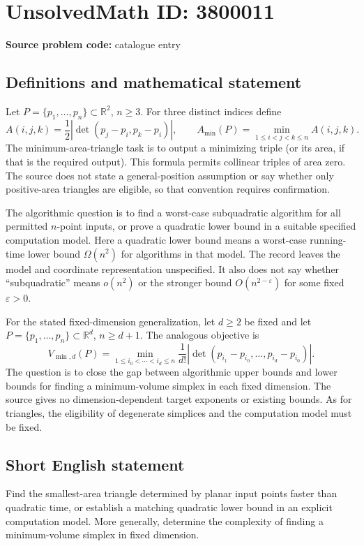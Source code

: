\documentclass[11pt]{article}
\newcommand{\R}{\mathbb{R}}
\begin{document}
\section*{UnsolvedMath ID: 3800011}
\textbf{Source problem code:} catalogue entry
\subsection{Definitions and mathematical statement}
Let $P=\{p_1,\ldots,p_n\}\subset\R^2$, $n\ge3$. For three distinct indices define
\[
 A(i,j,k)=\frac12\left|\det(p_j-p_i,p_k-p_i)\right|,
 \qquad A_{\min}(P)=\min_{1\le i<j<k\le n}A(i,j,k).
\]
The minimum-area-triangle task is to output a minimizing triple (or its area, if that is the required output). This formula permits collinear triples of area zero. The source does not state a general-position assumption or say whether only positive-area triangles are eligible, so that convention requires confirmation.

The algorithmic question is to find a worst-case subquadratic algorithm for all permitted $n$-point inputs, or prove a quadratic lower bound in a suitable specified computation model. Here a quadratic lower bound means a worst-case running-time lower bound $\Omega(n^2)$ for algorithms in that model. The record leaves the model and coordinate representation unspecified. It also does not say whether ``subquadratic'' means $o(n^2)$ or the stronger bound $O(n^{2-\varepsilon})$ for some fixed $\varepsilon>0$.

For the stated fixed-dimension generalization, let $d\ge2$ be fixed and let $P=\{p_1,\ldots,p_n\}\subset\R^d$, $n\ge d+1$. The analogous objective is
\[
 V_{\min,d}(P)=
 \min_{1\le i_0<\cdots<i_d\le n}
 \frac1{d!}\left|\det(p_{i_1}-p_{i_0},\ldots,p_{i_d}-p_{i_0})\right|.
\]
The question is to close the gap between algorithmic upper bounds and lower bounds for finding a minimum-volume simplex in each fixed dimension. The source gives no dimension-dependent target exponents or existing bounds. As for triangles, the eligibility of degenerate simplices and the computation model must be fixed.
\subsection{Short English statement}
Find the smallest-area triangle determined by planar input points faster than quadratic time, or establish a matching quadratic lower bound in an explicit computation model. More generally, determine the complexity of finding a minimum-volume simplex in fixed dimension.
\end{document}
